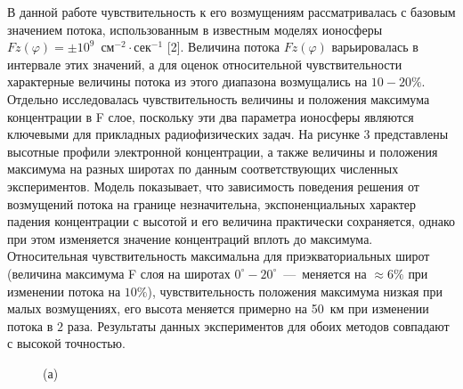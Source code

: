 \documentclass[14pt, a4paper]{extarticle}
\begin{document}
В данной работе чувствительность к его возмущениям рассматривалась с базовым значением потока, использованным в известным моделях ионосферы  $Fz(\varphi) = \pm 10^9$~см$^{-2}\cdot$сек$^{-1}$ [2]. Величина потока $Fz(\varphi)$ варьировалась в интервале этих значений, а для оценок относительной чувствительности характерные величины потока из этого диапазона возмущались на $10-20\%$. Отдельно исследовалась чувствительность величины и положения максимума концентрации в F слое, поскольку эти два параметра ионосферы являются ключевыми для прикладных радиофизических задач. На рисунке 3 представлены высотные профили электронной концентрации, а также величины и положения максимума на разных широтах по данным соответствующих численных экспериментов. Модель показывает, что зависимость поведения решения от возмущений потока на границе незначительна, экспоненциальных характер падения концентрации с высотой и его величина практически сохраняется, однако при этом изменяется значение концентраций вплоть до максимума. Относительная чувствительность максимальна для приэкваториальных широт (величина максимума F слоя на широтах $0^\circ-20^\circ$~---~меняется на $\approx 6\%$ при изменении потока на $10\%$), чувствительность положения максимума низкая при малых возмущениях, его высота меняется примерно на 50~км при изменении потока в $2$ раза. Результаты данных экспериментов для обоих методов совпадают с высокой точностью.


\begin{figure}[H]

(а) 

\end{figure}
\end{document}
